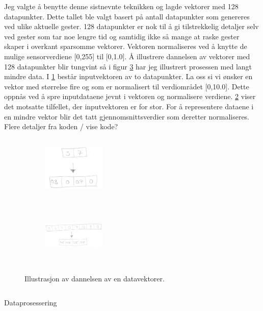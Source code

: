 Jeg valgte å benytte denne sistnevnte teknikken og lagde vektorer med 128 datapunkter. Dette tallet ble valgt basert på antall datapunkter som genereres ved ulike aktuelle gester. 128 datapunkter er nok til å gi tilstrekkelig detaljer selv ved gester som tar noe lengre tid og samtidig ikke så mange at raske gester skaper i overkant sparsomme vektorer. Vektoren normaliseres ved å knytte de mulige sensorverdiene [0,255] til [0,1.0]. Å illustrere dannelsen av vektorer med 128 datapunkter blir tungvint så i figur \ref{fig:data} har jeg illustrert prosessen med langt mindre data. I \ref{fig:few} består inputvektoren av to datapunkter. La oss si vi ønsker en vektor med størrelse fire og som er normalisert til verdiområdet [0,10.0]. Dette oppnås ved å spre inputdataene jevnt i vektoren og normalisere verdiene. \ref{fig:many} viser det motsatte tilfellet, der inputvektoren er for stor. For å representere dataene i en mindre vektor blir det tatt gjennomsnittsverdier som deretter normaliseres. {\color{red}Flere detaljer fra koden / vise kode?}
\begin{figure}[h]
\centering
\begin{subfigure}{0.23\textwidth}
\includegraphics[width=3cm, height=3cm]{fig/few-to-many}
\caption{}
\label{fig:few}
\end{subfigure}
\begin{subfigure}{0.23\textwidth}
\includegraphics[width=3cm, height=3cm]{fig/many-to-few}
\caption{}
\label{fig:many}
\end{subfigure}
\caption{Illustrasjon av dannelsen av en datavektorer.}
\label{fig:data}
\end{figure}

\begin{listing}[ht]
\inputminted[fontsize=\footnotesize, linenos]{python}{kodesnutter/preprocess_data.py}
\label{code:dataprocessing}
\caption{Dataprosessering}
\end{listing}

